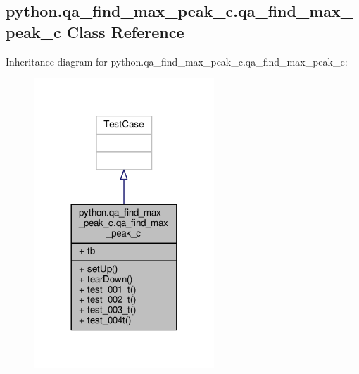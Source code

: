 \subsection{python.\+qa\+\_\+find\+\_\+max\+\_\+peak\+\_\+c.\+qa\+\_\+find\+\_\+max\+\_\+peak\+\_\+c Class Reference}
\label{classpython_1_1qa__find__max__peak__c_1_1qa__find__max__peak__c}


Inheritance diagram for python.\+qa\+\_\+find\+\_\+max\+\_\+peak\+\_\+c.\+qa\+\_\+find\+\_\+max\+\_\+peak\+\_\+c\+:
\nopagebreak
\begin{figure}[H]
\begin{center}
\leavevmode
\includegraphics[width=192pt]{db/d97/classpython_1_1qa__find__max__peak__c_1_1qa__find__max__peak__c__inherit__graph}
\end{center}
\end{figure}


